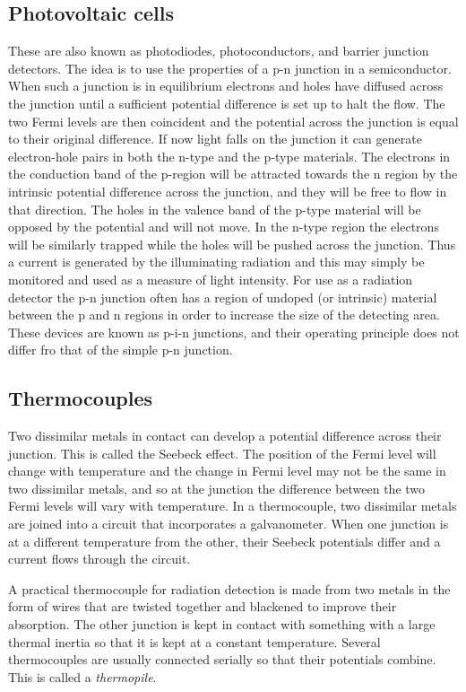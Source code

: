 \subsection{Photovoltaic cells}
These are also known as photodiodes,
photoconductors, and barrier junction detectors. The idea is to use the
properties of a p-n junction in a semiconductor. When such a junction
is in equilibrium electrons and holes have diffused across the
junction until a sufficient potential difference is set up to halt the
flow. The two Fermi levels are then coincident and the potential
across the junction is equal to their original difference. If now
light falls on the junction it can generate electron-hole pairs in
both the n-type and the p-type materials. The electrons in the
conduction band of the p-region will be attracted towards the n region
by the intrinsic potential difference across the junction, and they
will be free to flow in that direction. The holes in the valence band
of the p-type material will be opposed by the potential and will not
move. In the n-type region the electrons will be similarly trapped
while the holes will be pushed across the junction. Thus a current is
generated by the illuminating radiation and this may simply be
monitored and used as a measure of light intensity. For use as a
radiation detector the p-n junction often has a region of undoped (or
intrinsic) material between the p and n regions in order to increase
the size of the detecting area. These devices are known as p-i-n
junctions, and their operating principle does not differ fro that of
the simple p-n junction.

\subsection{Thermocouples}
Two dissimilar metals in contact can
develop a potential difference across their junction. This is called
the Seebeck effect. The position of the Fermi level will change with
temperature and the change in Fermi level may not be the same in two
dissimilar metals, and so at the junction the difference between the
two Fermi levels will vary with temperature. In a thermocouple, two
dissimilar metals are joined into a circuit that incorporates a
galvanometer. When one junction is at a different temperature from the
other, their Seebeck potentials differ and a current flows through the
circuit. 

A practical thermocouple for radiation detection is made from two
metals in the form of wires that are twisted together and blackened to
improve their absorption. The other junction is kept in contact with
something with a large thermal inertia so that it is kept at a
constant temperature. Several thermocouples are usually connected
serially so that their potentials combine. This is called a {\it
  thermopile}.

